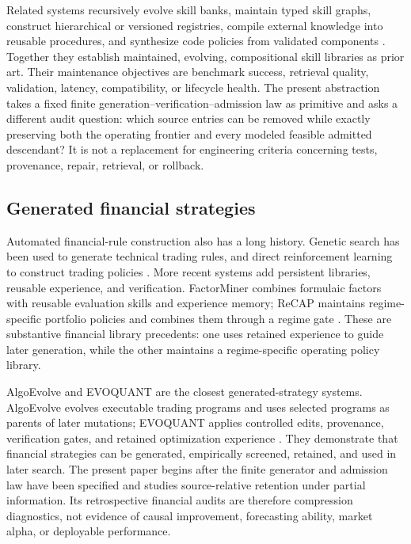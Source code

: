 Related systems recursively evolve skill banks, maintain typed skill graphs,
construct hierarchical or versioned registries, compile external knowledge
into reusable procedures, and synthesize code policies from validated
components
\cite{XiaEtAl2026SkillRL,LiEtAl2026SkillGraph,WangEtAl2026AutoSkills,%
PanEtAl2026Anything2Skill,ChunEtAl2026FCGraft}.  Together they establish
maintained, evolving, compositional skill libraries as prior art.  Their
maintenance objectives are benchmark success, retrieval quality, validation,
latency, compatibility, or lifecycle health.  The present abstraction takes a
fixed finite generation--verification--admission law as primitive and asks a
different audit question: which source entries can be removed while exactly
preserving both the operating frontier and every modeled feasible admitted
descendant?  It is not a replacement for engineering criteria concerning
tests, provenance, repair, retrieval, or rollback.

\subsection{Generated financial strategies}

Automated financial-rule construction also has a long history.  Genetic
search has been used to generate technical trading rules, and direct
reinforcement learning to construct trading policies
\cite{AllenKarjalainen1999,MoodySaffell2001}.  More recent systems add
persistent libraries, reusable experience, and verification.  FactorMiner
combines formulaic factors with reusable evaluation skills and experience
memory; ReCAP maintains regime-specific portfolio policies and combines them
through a regime gate
\cite{WangEtAl2026FactorMiner,PanEtAl2026ReCAP}.  These are substantive
financial library precedents: one uses retained experience to guide later
generation, while the other maintains a regime-specific operating policy
library.

AlgoEvolve and EVOQUANT are the closest generated-strategy systems.
AlgoEvolve evolves executable trading programs and uses selected programs as
parents of later mutations; EVOQUANT applies controlled edits, provenance,
verification gates, and retained optimization experience
\cite{SharmaShroff2026AlgoEvolve,MaoEtAl2026EvoQuant}.  They demonstrate that
financial strategies can be generated, empirically screened, retained, and
used in later search.  The present paper begins after the finite generator and
admission law have been specified and studies source-relative retention under
partial information.  Its retrospective financial audits are therefore
compression diagnostics, not evidence of causal improvement, forecasting
ability, market alpha, or deployable performance.

